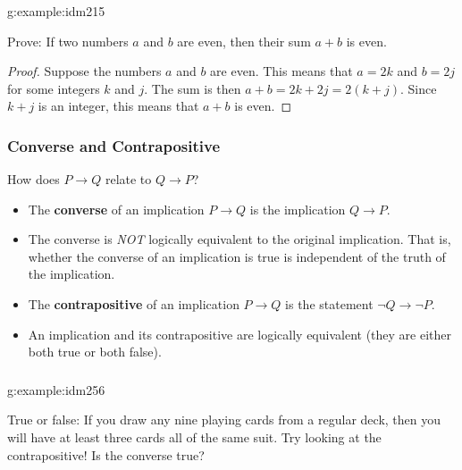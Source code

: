 \documentclass[11pt, compress]{beamer}
\newcommand{\terminology}[1]{\textbf{#1}}\newcommand{\lt}{<}
\newcommand{\imp}{\rightarrow}
\begin{document}
\begin{frame}
\frametitle{}
\begin{example}{}{g:example:idm215}%

Prove: If two numbers \(a\) and \(b\) are even, then their sum \(a+b\) is even.\end{example}
 \begin{proof}
\pause 
Suppose the numbers \(a\) and \(b\) are even. This means that \(a = 2k\) and \(b=2j\) for some integers \(k\) and \(j\). The sum is then \(a+b = 2k+2j = 2(k+j)\). Since \(k+j\) is an integer, this means that \(a+b\) is even.\end{proof}\end{frame}
 
\begin{frame}
\frametitle{Converse and Contrapositive}
 
How does \(P \imp Q\) relate to \(Q \imp P\)?\pause 
\begin{itemize}[<+->]
\item{}
The \terminology{converse}  of an implication \(P \imp Q\) is the implication \(Q \imp P\).

\item{}
The converse is \emph{NOT} logically equivalent to the original implication. That is, whether the converse of an implication is true is independent of the truth of the implication.

\item{}
The \terminology{contrapositive} of an implication \(P \imp Q\) is the statement \(\neg Q \imp \neg P\).

\item{}
An implication and its contrapositive are logically equivalent (they are either both true or both false).
\end{itemize}\end{frame}
 
\begin{frame}
\frametitle{}
\begin{example}{}{g:example:idm256}%

True or false: If you draw any nine playing cards from a regular deck, then you will have at least three cards all of the same suit.
\pause 
Try looking at the contrapositive!
\pause 
Is the converse true?\end{example}
\end{frame}
 
\end{document}
